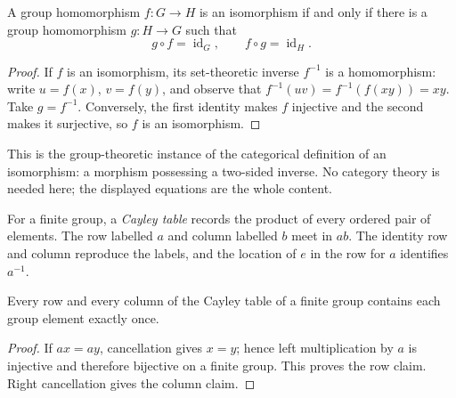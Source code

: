 \begin{theorem}
A group homomorphism \(f:G\to H\) is an isomorphism if and only if there is a
group homomorphism \(g:H\to G\) such that
\[
g\circ f=\operatorname{id}_G,\qquad f\circ g=\operatorname{id}_H.
\]
\end{theorem}
\begin{proof}
If \(f\) is an isomorphism, its set-theoretic inverse \(f^{-1}\) is a
homomorphism: write \(u=f(x)\), \(v=f(y)\), and observe that
\(f^{-1}(uv)=f^{-1}(f(xy))=xy\). Take \(g=f^{-1}\). Conversely, the first
identity makes \(f\) injective and the second makes it surjective, so \(f\)
is an isomorphism.
\end{proof}

\begin{remark}
This is the group-theoretic instance of the categorical definition of an
isomorphism: a morphism possessing a two-sided inverse. No category theory is
needed here; the displayed equations are the whole content.
\end{remark}

For a finite group, a \emph{Cayley table} records the product of every ordered
pair of elements. The row labelled \(a\) and column labelled \(b\) meet in
\(ab\). The identity row and column reproduce the labels, and the location of
\(e\) in the row for \(a\) identifies \(a^{-1}\).

\begin{proposition}
Every row and every column of the Cayley table of a finite group contains each
group element exactly once.
\end{proposition}
\begin{proof}
If \(ax=ay\), cancellation gives \(x=y\); hence left multiplication by \(a\)
is injective and therefore bijective on a finite group. This proves the row
claim. Right cancellation gives the column claim.
\end{proof}

